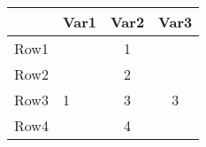 \begin{tabular}{rlcc}
\hline
 & Var1 & Var2 & Var3 \\ 
\hline
Row1 &  & 1 &  \\ 
Row2 &  & 2 &  \\ 
Row3 & 1 & 3 & 3 \\ 
Row4 &  & 4 &  \\ 
\hline
\end{tabular}%
